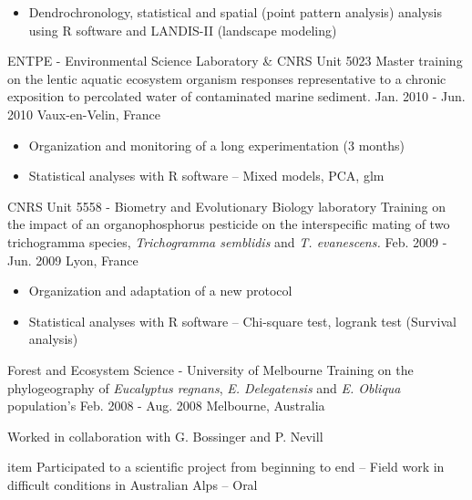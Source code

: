 \begin{cventries}
{\begin{cvitems}
\begin{itemize}[label=$\bullet$,topsep=2pt]
        \item {Dendrochronology, statistical and spatial (point pattern
            analysis) analysis using R software and LANDIS-II (landscape
            modeling)}
      \end{itemize}
      \end{cvitems} 
    }
  \cventry
  {ENTPE - Environmental Science Laboratory \& CNRS Unit 5023}
  {Master training on the lentic aquatic ecosystem organism responses representative to a chronic exposition to percolated water of contaminated marine sediment.}
  {Jan. 2010 - Jun. 2010}
    {Vaux-en-Velin, France}
{
  \begin{cvitems}
          \begin{itemize}[label=$\bullet$,topsep=2pt]
    \item {Organization and monitoring of a long experimentation (3 months)}
    \item {Statistical analyses with R software – Mixed models, PCA, glm}
          \end{itemize}
\end{cvitems} 
  }
    \cventry
  {CNRS Unit 5558 - Biometry and Evolutionary Biology laboratory}
  {Training on the impact of an organophosphorus pesticide on the interspecific mating of two trichogramma species, \textit{Trichogramma semblidis} and \textit{T. evanescens.}}
  {Feb. 2009 - Jun. 2009}
    {Lyon, France}
{
  \begin{cvitems}
              \begin{itemize}[label=$\bullet$,topsep=2pt]
    \item {Organization and adaptation of a new protocol}
    \item {Statistical analyses with R software – Chi-square test, logrank test (Survival analysis)}
              \end{itemize}
\end{cvitems} 
  }
      \cventry
  {Forest and Ecosystem Science - University of Melbourne}
  {Training on the phylogeography of \textit{Eucalyptus regnans}, \textit{E. Delegatensis} and \textit{E. Obliqua} population’s}
  {Feb. 2008 - Aug. 2008}
    {Melbourne, Australia}
{
    \begin{cvitems}
    \item []{\textnormal{Worked in collaboration with G. Bossinger and P. Nevill}}
    \              \begin{itemize}[label=$\bullet$,topsep=2pt]
item {Participated to a scientific project from beginning to end
        – Field work in difficult conditions in Australian Alps – Oral
}
\end{itemize}
\end{cvitems}}
\end{cventries}
